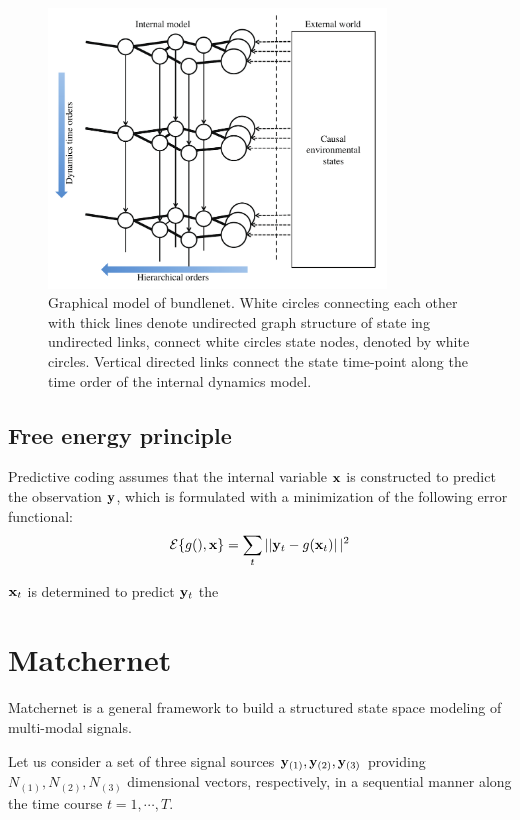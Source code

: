 \documentclass{article}
\begin{document}
\begin{figure}[htbp]
  \includegraphics[width=0.8\textwidth]{../figures/gmodel_BN.pdf}
  \caption{Graphical model of bundlenet. 
  White circles connecting each other with thick lines denote
  undirected graph structure of state ing undirected links, connect white circles state nodes, denoted by white circles.
  Vertical directed links connect the state time-point along
   the time order of the internal dynamics model. }
   \label{g_BN}
\end{figure}



\subsection{Free energy principle}
Predictive coding assumes that the internal variable ${\bf x}$ is constructed to predict the observation ${\bf y}$,
which is formulated with a minimization of the following error functional:
\begin{align}
 {\cal E}\{ g(), {\bf x} \} = \sum_t \left|| {\bf y}_{t} - g({\bf x}_t) \right||^2
\end{align}

${\bf x}_t$ is determined to predict ${\bf y}_t$ the






\section{Matchernet}
Matchernet is a general framework to build a structured state space modeling of multi-modal signals.

Let us consider a set of three signal sources ${\bf y}_{(1)}, {\bf y}_{(2)}, {\bf y}_{(3)}$ providing
$N_{(1)}, N_{(2)}, N_{(3)}$ dimensional vectors, respectively, in a sequential manner along the time course $t=1, \cdots, T$.
 
\end{document}

